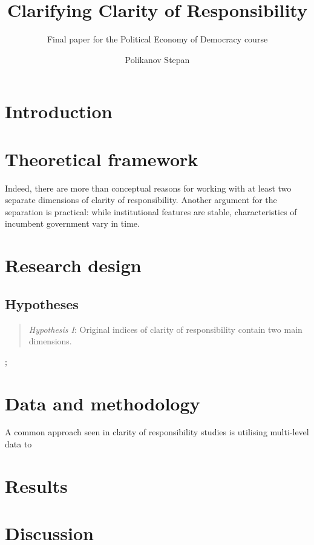 \documentclass[paper = A4, 10pt, headsepline]{scrarticle}
\title{Clarifying Clarity of Responsibility}
\subtitle{Final paper for the Political Economy of Democracy course}
\author{Polikanov Stepan}
\date{}
\begin{document}
\maketitle

\section{Introduction}

\section{Theoretical framework}

Indeed, there are more than conceptual reasons for working with at least two separate dimensions of clarity of responsibility. Another argument for the separation is practical: while institutional features are stable, characteristics of incumbent government vary in time. 

\section{Research design}

\subsection{Hypotheses}

\begin{quote}
    \textit{Hypothesis I}: Original indices of clarity of responsibility contain two main dimensions.
\end{quote};

\section{Data and methodology}

A common approach seen in clarity of responsibility studies is utilising multi-level data to 

\section{Results}

\section{Discussion}

\printbibliography
\end{document}

